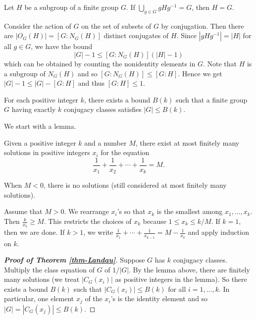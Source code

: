 \begin{corollary}
	Let $H$ be a subgroup of a finite group $G$. If $\bigcup_{g\in G}gHg^{-1} = G$, then $H = G$.
\end{corollary}
\begin{sketch}
	Consider the action of $G$ on the set of subsets of $G$ by conjugation. Then there are $|O_G(H)| = [G:N_G(H)]$ distinct conjugates of $H$. Since $|gHg^{-1}| = |H|$ for all $g\in G$, we have the bound
	$$|G|-1\leq [G:N_G(H)](|H|-1)$$
	which can be obtained by counting the nonidentity elements in $G$. Note that $H$ is a subgroup of $N_G(H)$ and so $[G:N_G(H)]\leq [G:H]$. Hence we get $|G|-1\leq |G| - [G:H]$ and thus $[G:H]\leq 1$.
\end{sketch}

\begin{theorem}[Landau] \label{thm-Landau}
	For each positive integer $k$, there exists a bound $B(k)$ such that a finite group $G$ having exactly $k$ conjugacy classes satisfies $|G|\leq B(k)$.
\end{theorem}
We start with a lemma.
\begin{lemma}
	Given a positive integer $k$ and a number $M$, there exist at most finitely many solutions in positive integers $x_i$ for the equation
	$$\frac{1}{x_1}+ \frac{1}{x_2} + \cdots + \frac{1}{x_k} = M.$$
\end{lemma}
\begin{sketch}
	When $M<0$, there is no solutions (still considered at most finitely many solutions).
	
	Assume that $M>0$. We rearrange $x_i$'s so that $x_k$ is the smallest among $x_1,\dots, x_k$. Then $\frac{k}{x_k}\geq M$. This restricts the choices of $x_k$ because $1\leq x_k \leq k/M$. If $k =1$, then we are done. If $k>1$, we write $\frac{1}{x_1} + \cdots + \frac{1}{x_{k-1}} = M - \frac{1}{x_k}$ and apply induction on $k$.
\end{sketch}
\begin{proof}[\textbf{Proof of Theorem \ref{thm-Landau}}]
	Suppose $G$ has $k$ conjugacy classes. Multiply the class equation of $G$ of $1/|G|$. By the lemma above, there are finitely many solutions (we treat $|C_G(x_i)|$ as positive integers in the lemma). So there exists a bound $B(k)$ such that $|C_G(x_i)|\leq B(k)$ for all $i = 1,\dots, k$. In particular, one element $x_j$ of the $x_i$'s is the identity element and so $|G| = |C_G(x_j)|\leq B(k)$.
\end{proof}

